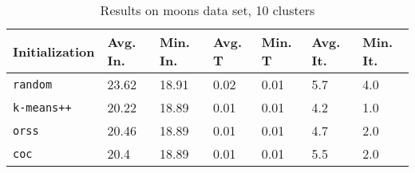 \begin{table}[h]
	\begin{center}
		\begin{tabular}{|l|l|l|l|l|l|l|}
			\hline
			Initialization & Avg. In. & Min. In. & Avg. T & Min. T & Avg. It. & Min. It.\\\hline
			\texttt{random} & 23.62 & 18.91 & 0.02 & 0.01 & 5.7 & 4.0\\\hline
			\texttt{k-means++} & 20.22 & 18.89 & 0.01 & 0.01 & 4.2 & 1.0\\\hline
			\texttt{orss} & 20.46 & 18.89 & 0.01 & 0.01 & 4.7 & 2.0\\\hline
			\texttt{coc} & 20.4 & 18.89 & 0.01 & 0.01 & 5.5 & 2.0\\\hline
		\end{tabular}
		\caption{Results on moons data set, 10 clusters}
		\label{tbl:moons10}
	\end{center}
\end{table}

